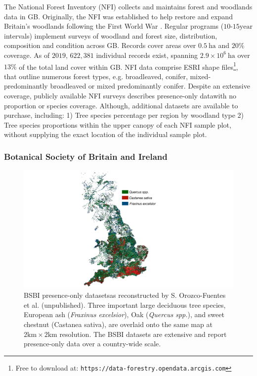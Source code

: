 The National Forest Inventory (NFI) collects and maintains forest and woodlands data in GB.
Originally, the NFI was established to help restore and expand Britain's woodlands following the First World War \cite{james1990history}.
Regular programs ($10$-$15\mathrm{year}$ intervals) implement surveys of woodland and forest size, distribution, composition and condition across GB.
Records cover areas over $0.5\ \mathrm{ha}$ and $20\%$ coverage.
As of $2019$, $622,381$ individual records exist, spanning $2.9 \times 10^6\ \mathrm{ha}$ over $13\%$ of the total land cover within GB.
NFI data comprise ESRI shape files\footnote{
Free to download at: \nolinkurl{https://data-forestry.opendata.arcgis.com}},
that outline numerous forest types, e.g. broadleaved, conifer, mixed-predominantly broadleaved or mixed predominantly conifer.
Despite an extensive coverage, publicly available NFI surveys describes presence-only data\textemdash with no proportion or species coverage.
Although, additional datasets are available to purchase, including: 
1) Tree species percentage per region by woodland type
2) Tree species proportions within the upper canopy of each NFI sample plot, without supplying the exact location of the individual sample plot.

\subsubsection{Botanical Society of Britain and Ireland}

\begin{figure}
    \centering
    \includegraphics[scale=0.25]{chapter2/figures/bsbi-data.pdf}
    \caption{BSBI presence-only datasets\textemdash as reconstructed by S. Orozco-Fuentes et al. (unpublished).
    Three important large deciduous tree species, European ash (\textit{Fraxinus excelsior}), 
    Oak (\textit{Quercus spp.}), and sweet chestnut (Castanea sativa), are overlaid onto the same map at $\mathrm{2km \times 2km}$ resolution.
    The BSBI datasets are extensive and report presence-only data over a country-wide scale.
    }
    \label{fig:bsbi-data}
\end{figure}

